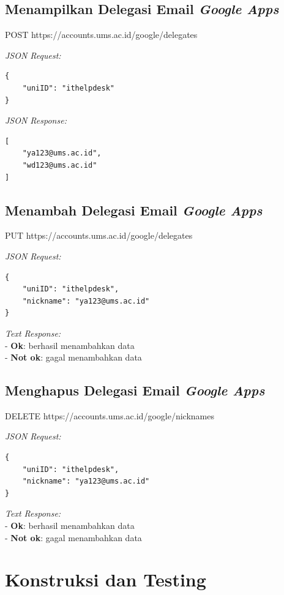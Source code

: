 \subsection{Menampilkan Delegasi Email \textit{Google Apps}}

POST https://accounts.ums.ac.id/google/delegates

\noindent
\textit{JSON Request:}
\begin{lstlisting}
{
    "uniID": "ithelpdesk"
}
\end{lstlisting}

\noindent
\textit{JSON Response:}
\begin{lstlisting}
[
    "ya123@ums.ac.id",
    "wd123@ums.ac.id"
]
\end{lstlisting}

\subsection{Menambah Delegasi Email \textit{Google Apps}}

PUT https://accounts.ums.ac.id/google/delegates

\noindent
\textit{JSON Request:}
\begin{lstlisting}
{
    "uniID": "ithelpdesk",
    "nickname": "ya123@ums.ac.id"
}
\end{lstlisting}

\noindent
\textit{Text Response:}\\
- \textbf{Ok}: berhasil menambahkan data\\
-  \textbf{Not ok}: gagal menambahkan data

\subsection{Menghapus Delegasi Email \textit{Google Apps}}

DELETE https://accounts.ums.ac.id/google/nicknames

\noindent
\textit{JSON Request:}
\begin{lstlisting}
{
    "uniID": "ithelpdesk",
    "nickname": "ya123@ums.ac.id"
}
\end{lstlisting}

\noindent
\textit{Text Response:}\\
- \textbf{Ok}: berhasil menambahkan data\\
-  \textbf{Not ok}: gagal menambahkan data

\section{Konstruksi dan Testing}

